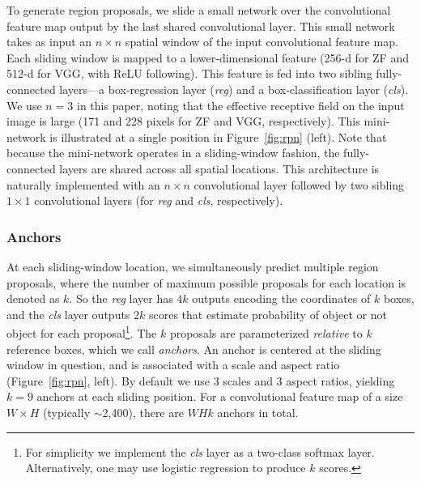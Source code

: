 \documentclass[10pt,journal,cspaper,compsoc]{IEEEtran}
\begin{document}
To generate region proposals, we slide a small network over the convolutional feature map output by the last shared convolutional layer.
This small network takes as input an $n \times n$ spatial window of the input convolutional feature map.
Each sliding window is mapped to a lower-dimensional feature (256-d for ZF and 512-d for VGG, with ReLU \cite{Nair2010} following).
This feature is fed into two sibling fully-connected layers---a box-regression layer (\emph{reg}) and a box-classification layer (\emph{cls}).
We use $n=3$ in this paper, noting that the effective receptive field on the input image is large (171 and 228 pixels for ZF and VGG, respectively).
This mini-network is illustrated at a single position in Figure~\ref{fig:rpn} (left).
Note that because the mini-network operates in a sliding-window fashion, the fully-connected layers are shared across all spatial locations.
This architecture is naturally implemented with an $n \times n$ convolutional layer followed by two sibling $1 \times 1$ convolutional layers (for \emph{reg} and \emph{cls}, respectively). %


\subsubsection{Anchors}

At each sliding-window location, we simultaneously predict multiple region proposals, where the number of maximum possible proposals for each location is denoted as $k$.
So the \emph{reg} layer has $4k$ outputs encoding the coordinates of $k$ boxes, and the \emph{cls} layer outputs $2k$ scores that estimate probability of object or not object for each proposal\footnote{For simplicity we implement the \emph{cls} layer as a two-class softmax layer. Alternatively, one may use logistic regression to produce $k$ scores.}. The $k$ proposals are parameterized \emph{relative} to $k$ reference boxes, which we call \emph{anchors}. An anchor is centered at the sliding window in question, and is associated with a scale and aspect ratio (Figure~\ref{fig:rpn}, left). By default we use 3 scales and 3 aspect ratios, yielding $k=9$ anchors at each sliding position. For a convolutional feature map of a size $W \times H$ (typically $\sim$2,400), there are $WHk$ anchors in total.
\end{document}
